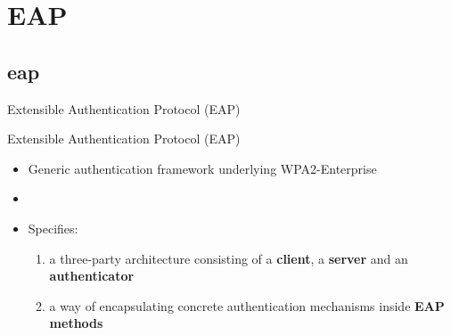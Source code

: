 \documentclass[xcolor={dvipsnames},screen,compress]{beamer}
\makeatletter
\let\beamer@writeslidentry@miniframeson=\beamer@writeslidentry
\def\beamer@writeslidentry@miniframesoff{%
  \expandafter\beamer@ifempty\expandafter{\beamer@framestartpage}{}%
  {%
     removed \addtocontents commands
    \clearpage\beamer@notesactions%
  }
}
\newcommand*{\miniframeson}{\let\beamer@writeslidentry=\beamer@writeslidentry@miniframeson}
\newcommand*{\miniframesoff}{\let\beamer@writeslidentry=\beamer@writeslidentry@miniframesoff}
\makeatother
\begin{document}
\section{EAP}
\subsection{eap}


\begin{frame}
	
	\vfill
	\vfill
	\vfill
	\centering
	Extensible Authentication Protocol (EAP)
	\vfill
	\vfill
	\vfill
\end{frame}


\begin{frame}{Extensible Authentication Protocol (EAP)}
	\begin{itemize}
		\item Generic authentication framework underlying WPA2-Enterprise
		
		\item[]
		
		\item<2-> Specifies:
		
		\begin{enumerate}
			\item<2-> a three-party architecture consisting of a \textbf{client}, a \textbf{server} and an \textbf{authenticator}

		
			\item<3-> a way of encapsulating concrete authentication mechanisms inside \textbf{EAP methods}
			
			\vspace*{0.2cm}
\end{enumerate}
\end{itemize}
\end{frame}
\end{document}
